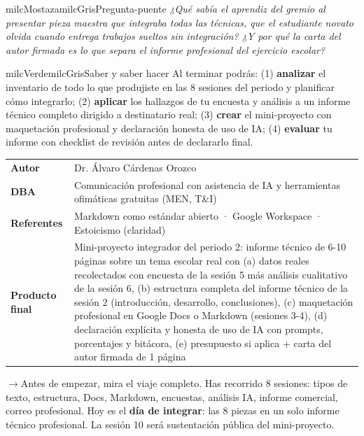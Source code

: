 \documentclass[11pt,letterpaper]{article}
\newcommand{\puente}[1]{%
  \begin{puentebox}%
    \textcolor{milcGradeDark}{$\rightarrow$}\hspace{2mm}#1%
  \end{puentebox}%
}
\begin{document}
\begin{softbox}{milcMostaza}{milcGris}{Pregunta-puente}
\textit{¿Qué sabía el aprendiz del gremio al presentar pieza maestra que integraba todas las técnicas, que el estudiante novato olvida cuando entrega trabajos sueltos sin integración? ¿Y por qué la carta del autor firmada es lo que separa el informe profesional del ejercicio escolar?}
\end{softbox}

\begin{softbox}{milcVerde}{milcGris}{Saber y saber hacer}
Al terminar podrás: (1) \textbf{analizar} el inventario de todo lo que produjiste en las 8 sesiones del periodo y planificar cómo integrarlo; (2) \textbf{aplicar} los hallazgos de tu encuesta y análisis a un informe técnico completo dirigido a destinatario real; (3) \textbf{crear} el mini-proyecto con maquetación profesional y declaración honesta de uso de IA; (4) \textbf{evaluar} tu informe con checklist de revisión antes de declararlo final.
\end{softbox}



\small
\begin{tabularx}{\textwidth}{>{\bfseries}p{3.0cm}Y}
Autor & Dr. Álvaro Cárdenas Orozco\\
DBA & Comunicación profesional con asistencia de IA y herramientas ofimáticas gratuitas (MEN, T\&I)\\
Referentes & Markdown como estándar abierto · Google Workspace · Estoicismo (claridad)\\
Producto final & Mini-proyecto integrador del periodo 2: informe técnico de 6-10 páginas sobre un tema escolar real con (a) datos reales recolectados con encuesta de la sesión 5 más análisis cualitativo de la sesión 6, (b) estructura completa del informe técnico de la sesión 2 (introducción, desarrollo, conclusiones), (c) maquetación profesional en Google Docs o Markdown (sesiones 3-4), (d) declaración explícita y honesta de uso de IA con prompts, porcentajes y bitácora, (e) presupuesto si aplica + carta del autor firmada de 1 página\\
\end{tabularx}
\normalsize

\puente{Antes de empezar, mira el viaje completo. Has recorrido 8 sesiones: tipos de texto, estructura, Docs, Markdown, encuestas, análisis IA, informe comercial, correo profesional. Hoy es el \textbf{día de integrar}: las 8 piezas en un solo informe técnico profesional. La sesión 10 será sustentación pública del mini-proyecto.}
\end{document}
